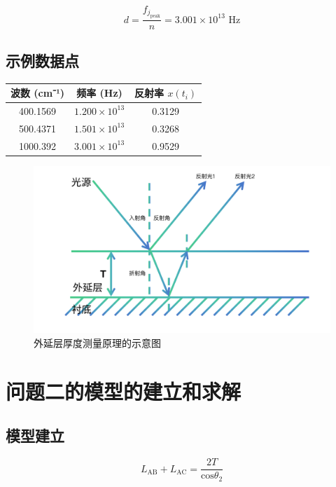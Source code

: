 \documentclass[withoutpreface,bwprint]{cumcmthesis}
\begin{document}
\begin{equation}
d = \frac{f_{j_{\text{peak}}}}{n} = 3.001 \times 10^{13} \text{ Hz}
\end{equation}

\subsection*{示例数据点}
\begin{tabular}{|c|c|c|}
\hline
波数 (cm⁻¹) & 频率 (Hz) & 反射率 \( x(t_i) \) \\
\hline
400.1569 & \( 1.200 \times 10^{13} \) & 0.3129 \\
500.4371 & \( 1.501 \times 10^{13} \) & 0.3268 \\
1000.392 & \( 3.001 \times 10^{13} \) & 0.9529 \\
\hline
\end{tabular}

\begin{figure}
    \centering
    \includegraphics[width=1\linewidth]{../figures/AMCMUM.pdf}
    \caption{外延层厚度测量原理的示意图}
    \label{fig:placeholder}
\end{figure}


\section{问题二的模型的建立和求解}
\subsection{模型建立}
\begin{equation}L_{\mathrm{AB}}+L_{\mathrm{AC}}=\frac{2T}{\mathrm{cos}\theta_2}\end{equation}
\end{document}
